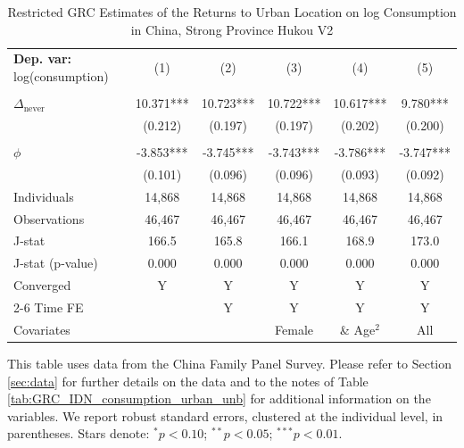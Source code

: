 \begin{table}[htbp] \centering \begin{threeparttable}
 \caption{Restricted GRC Estimates of the Returns to Urban Location on log Consumption in China, Strong Province Hukou V2} 
 \label{tab:GRC_CHN_strong_v2_consumption_urban_unb} 
\begin{tabular}{l ccccc} \toprule  \textbf{Dep. var:}  log(consumption) 
                    &\multicolumn{1}{c}{(1)}   &\multicolumn{1}{c}{(2)}   &\multicolumn{1}{c}{(3)}   &\multicolumn{1}{c}{(4)}   &\multicolumn{1}{c}{(5)}   \\
                    &               &               &               &               &               \\
\addlinespace
$\Delta_{\text{never}}$&      10.371***&      10.723***&      10.722***&      10.617***&       9.780***\\
                    &     (0.212)   &     (0.197)   &     (0.197)   &     (0.202)   &     (0.200)   \\
                    &               &               &               &               &               \\
\addlinespace
$\phi$              &      -3.853***&      -3.745***&      -3.743***&      -3.786***&      -3.747***\\
                    &     (0.101)   &     (0.096)   &     (0.096)   &     (0.093)   &     (0.092)   \\
\addlinespace
Individuals         &      14,868   &      14,868   &      14,868   &      14,868   &      14,868   \\
Observations        &      46,467   &      46,467   &      46,467   &      46,467   &      46,467   \\
J-stat              &       166.5   &       165.8   &       166.1   &       168.9   &       173.0   \\
J-stat (p-value)    &       0.000   &       0.000   &       0.000   &       0.000   &       0.000   \\
Converged           &           Y   &           Y   &           Y   &           Y   &           Y   \\
\cmidrule{2-6} Time FE & & Y & Y & Y & Y \\ Covariates & & & Female & \& Age$^2$ & All \\ \bottomrule \end{tabular} \begin{tablenotes}[flushleft] \footnotesize \item{This table uses data from the China Family Panel Survey. Please refer to Section \ref{sec:data} for further details on the data and to the notes of Table \ref{tab:GRC_IDN_consumption_urban_unb} for additional information on the variables. We report robust standard errors, clustered at the individual level, in parentheses. Stars denote: $^{*} p<0.10$; $^{**} p<0.05$; $^{***} p<0.01$.} \end{tablenotes} \end{threeparttable} \end{table}
